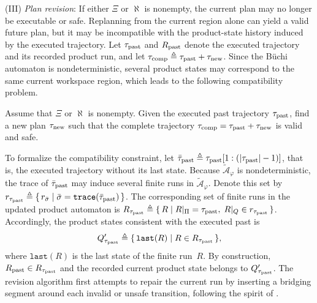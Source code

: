 (III) \emph{Plan revision}:
If either $\Xi$ or $\aleph$ is nonempty, the current plan may no longer be
executable or safe. Replanning from the current region alone can yield a valid
future plan, but it may be incompatible with the product-state history induced
by the executed trajectory. Let $\tau_{\textup{past}}$ and
$R_{\textup{past}}$ denote the executed trajectory and its recorded product run,
and let
$\tau_{\textup{comp}} \triangleq
\tau_{\textup{past}} + \tau_{\textup{new}}$. Since the B\"uchi automaton is
nondeterministic, several product states may correspond to the same current
workspace region, which leads to the following compatibility problem.

\begin{problem}\label{ch03:prob:concatenate}
Assume that $\Xi$ or $\aleph$ is nonempty. Given the executed past trajectory
$\tau_{\textup{past}}$, find a new plan $\tau_{\textup{new}}$ such that the
complete trajectory
$\tau_{\textup{comp}} = \tau_{\textup{past}} + \tau_{\textup{new}}$
is valid and safe.
\end{problem}

To formalize the compatibility constraint, let
$\bar{\tau}_{\textup{past}} \triangleq
\tau_{\textup{past}}[1:(|\tau_{\textup{past}}|-1)]$, that is, the executed
trajectory without its last state. Because $\tilde{\mathcal{A}}_{\varphi}$ is
nondeterministic, the trace of $\bar{\tau}_{\textup{past}}$ may induce several
finite runs in $\tilde{\mathcal{A}}_{\varphi}$. Denote this set by
$r_{\tau_{\textup{past}}} \triangleq
\{\, r_{\bar{\sigma}}
\mid \bar{\sigma} = \texttt{trace}(\bar{\tau}_{\textup{past}}) \,\}$.
The corresponding set of finite runs in the updated product
automaton is
$R_{\tau_{\textup{past}}} \triangleq
\{\, R \mid R|_{\Pi} = \tau_{\textup{past}},\;
R|_{Q} \in r_{\tau_{\textup{past}}} \,\}$.
Accordingly, the product states consistent with the executed past is
\begin{equation}
Q'_{\tau_{\textup{past}}} \triangleq
\{\, \texttt{last}(R) \mid R \in R_{\tau_{\textup{past}}} \,\},
\label{ch03:eq:set-past}
\end{equation}
where $\texttt{last}(R)$ is the last state of the finite run~$R$. By
construction, $R_{\textup{past}} \in R_{\tau_{\textup{past}}}$ and the recorded
current product state belongs to $Q'_{\tau_{\textup{past}}}$. The revision
algorithm first attempts to repair the current run by inserting a bridging
segment around each invalid or unsafe transition, following the spirit of
\citet{guo2013revising}. 

